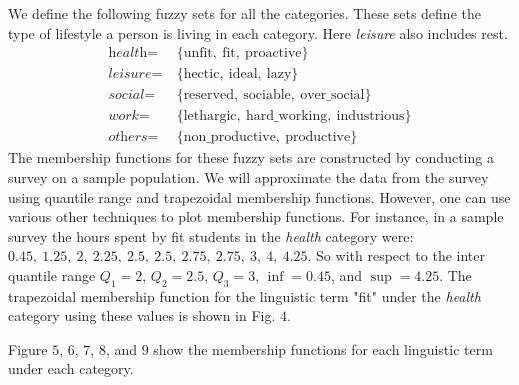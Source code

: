 \documentclass[conference]{IEEEtran}
\begin{document}
We define the following fuzzy sets for all the categories. These sets define the type of lifestyle a person is living in each category. Here \textit{leisure} also includes rest.
\begin{align*}
\textit{health}=&\ \{\text{unfit},\ \text{fit},\ \text{proactive}\}\\
\textit{leisure}=&\ \{\text{hectic},\ \text{ideal},\ \text{lazy}\}\\
\textit{social}=&\ \{\text{reserved},\ \text{sociable},\ \text{over\_social}\}\\
\textit{work}=&\ \{\text{lethargic},\ \text{hard\_working},\ \text{industrious}\}\\
\textit{others}=&\ \{\text{non\_productive},\ \text{productive}\}
\end{align*}
The membership functions for these fuzzy sets are constructed by conducting a survey on a sample population. We will approximate the data from the survey using quantile range and trapezoidal membership functions. However, one can use various other techniques to plot membership functions. For instance, in a sample survey the hours spent by fit students in the \textit{health} category were: $0.45,\ 1.25,\ 2,\ 2.25,\ 2.5,\ 2.5,\ 2.75,\ 2.75,\ 3,\ 4,\ 4.25$. So with respect to the inter quantile range $Q_1 = 2$, $Q_2 = 2.5$, $Q_3 = 3$, $\inf = 0.45$, and $\sup = 4.25$. The trapezoidal membership function for the linguistic term "fit" under the \textit{health} category using these values is shown in Fig. $4$.

Figure $5$, $6$, $7$, $8$, and $9$ show the membership functions for each linguistic term under each category.
\end{document}
